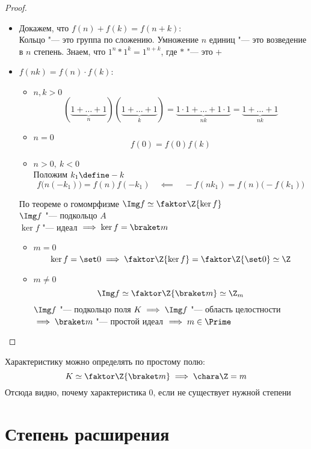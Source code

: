 \begin{theorem}
\begin{enumerate}
\begin{proof}
\begin{itemize}
\begin{itemize}
					\item Докажем, что $ f(n) + f(k) = f(n + k) $: \\
					Кольцо "--- это группа по сложению. Умножение $ n $ единиц "--- это возведение в $ n $ степень. Знаем, что $ 1^n * 1^k = 1^{n + k} $, где $ * $ "--- это $ + $
					\item $ f(nk) = f(n) \cdot f(k) $:
					\begin{itemize}
						\item $ n, k > 0 $
						$$ (\underbrace{1 + \dots + 1}_n)(\underbrace{1 + \dots + 1}_k) = \underbrace{1 \cdot 1 + \dots + 1 \cdot 1}_{nk} = \underbrace{1 + \dots + 1}_{nk} $$
						\item $ n = 0 $
						$$ f(0) = f(0) f(k) $$
						\item $ n > 0, ~ k < 0 $ \\
						Положим $ k_1 \define -k $
						$$ f \bigg( n(-k_1) \bigg) = f(n) f(-k_1) \quad \impliedby \quad -f(nk_1) = f(n) \bigg( -f(k_1) \bigg) $$
					\end{itemize}
					По теореме о гомомрфизме $ \Img f \simeq \faktor\Z{\ker f} $ \\
					$ \Img f $ "--- подкольцо $ A $ \\
					$ \ker f $ "--- идеал $ \implies \ker f = \braket m $
					\begin{itemize}
						\item $ m = 0 $
						$$ \ker f = \set0 \implies \faktor\Z{\ker f} = \faktor\Z{\set0} \simeq \Z $$
						\item $ m \ne 0 $
						$$ \Img f \simeq \faktor\Z{\braket m} \simeq \Z_m $$
						$ \Img f $ "--- подкольцо поля $ K \implies \Img f $ "--- область целостности \\
						$ \implies \braket m $ "--- простой идеал $ \implies m \in \Prime $
					\end{itemize}
				\end{itemize}
			\end{itemize}
		\end{proof}
	\end{enumerate}
\end{theorem}

\begin{remark}
	Характеристику можно определять по простому полю:
	$$ K \simeq \faktor\Z{\braket m} \implies \chara \Z = m $$
	Отсюда видно, почему характеристика 0, если не существует нужной степени
\end{remark}

\section{Степень расширения}

